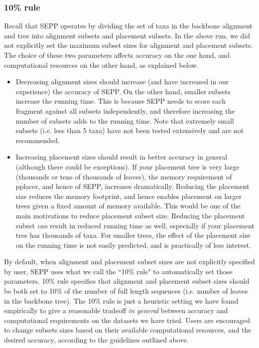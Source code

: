 \documentclass[11pt]{article} %
\newcommand{\sepp}{SEPP\xspace}
\newcommand{\pplacer}{pplacer\xspace}
\begin{document}
\subsubsection{10\% rule}
Recall that \sepp operates by dividing the set of taxa
in the backbone alignment and tree into alignment subsets and placement subsets. 
In the above run, we did not explicitly set the maximum subset sizes for alignment and placement subsets. 
The choice of these two parameters affects accuracy on the one hand, 
and computational resources on the other hand, as explained below. 

\begin{itemize} 
\item Decreasing alignment sizes should increase (and have increased in our experience) the accuracy of \sepp. On the other hand, smaller subsets increase the running time. This is because \sepp needs to score each fragment against all subsets independently, and therefore increasing the number of subsets adds to the running time. Note that extremely small subsets (i.e. less than 5 taxa) have not been tested extensively and are not recommended. 
\item Increasing placement sizes should result in better 
accuracy in general (although there could be exceptions). 
If your placement tree is very large (thousands or 
tens of thousands of leaves), the memory requirement of \pplacer, 
and hence of \sepp, increases dramatically. 
Reducing the placement size reduces the memory footprint, and hence 
enables placement on larger trees given a fixed amount of memory available. 
This would be one of the main motivations to reduce placement subset size. 
Reducing the placement subset {\em can} result in reduced running time 
as well, especially if your placement tree has thousands of taxa. 
For smaller trees, the effect of the placement size on 
the running time is not easily predicted, and is 
practically of less interest. 
\end{itemize}

By default, when alignment and placement subset sizes are 
not explicitly specified by user, \sepp uses what we call the 
``10\% rule" to automatically set those parameters. 10\% rule specifies that alignment and placement subset sizes should be both set to 10\% of the number of full length sequences (i.e. number of leaves in the backbone tree). The 10\% rule is just a heuristic setting we have found empirically to give a reasonable tradeoff {\em in general} between accuracy and computational requirements on the datasets we have tried. Users are encouraged to change subsets sizes based on their available computational resources, and the desired accuracy, according to the guidelines outlined above.  
\end{document}
